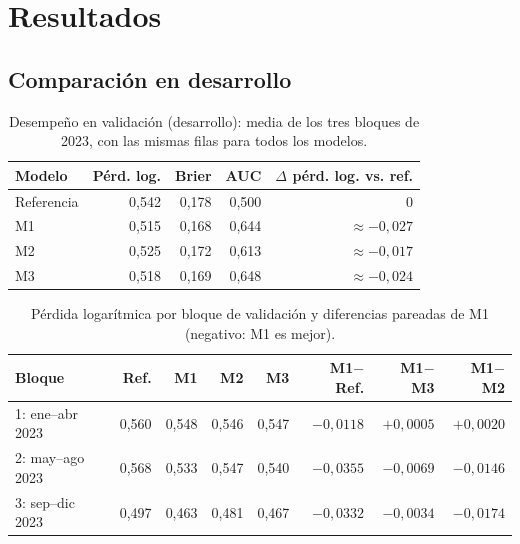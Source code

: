 \documentclass[11pt,a4paper]{article}
\begin{document}
 
 
\section{Resultados}
 
\subsection{Comparación en desarrollo}
\begin{table}[ht]
\centering
\caption{Desempeño en validación (desarrollo): media de los tres bloques de 2023, con las mismas filas para todos los modelos.}
\label{tab:dev}
\begin{tabularx}{\textwidth}{@{}Xrrrr@{}}
\toprule
Modelo & Pérd. log. & Brier & AUC & $\Delta$ pérd. log. vs. ref. \\
\midrule
Referencia & 0,542 & 0,178 & 0,500 & 0 \\
M1 & 0,515 & 0,168 & 0,644 & $\approx -0{,}027$ \\
M2 & 0,525 & 0,172 & 0,613 & $\approx -0{,}017$ \\
M3 & 0,518 & 0,169 & 0,648 & $\approx -0{,}024$ \\
\bottomrule
\end{tabularx}
\end{table}
 
\begin{table}[ht]
\centering
\caption{Pérdida logarítmica por bloque de validación y diferencias pareadas de M1 (negativo: M1 es mejor).}
\label{tab:devbloques}
\small
\begin{tabularx}{\textwidth}{@{}Xrrrrrrr@{}}
\toprule
Bloque & Ref. & M1 & M2 & M3 & M1$-$Ref. & M1$-$M3 & M1$-$M2 \\
\midrule
1: ene--abr 2023 & 0,560 & 0,548 & 0,546 & 0,547 & $-0{,}0118$ & $+0{,}0005$ & $+0{,}0020$ \\
2: may--ago 2023 & 0,568 & 0,533 & 0,547 & 0,540 & $-0{,}0355$ & $-0{,}0069$ & $-0{,}0146$ \\
3: sep--dic 2023 & 0,497 & 0,463 & 0,481 & 0,467 & $-0{,}0332$ & $-0{,}0034$ & $-0{,}0174$ \\
\bottomrule
\end{tabularx}
\end{table}
 
\end{document}
